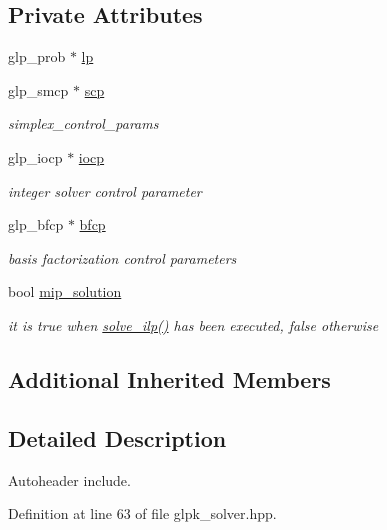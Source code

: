 \subsection*{Private Attributes}
\begin{DoxyCompactItemize}
\item 
glp\+\_\+prob $\ast$ \hyperlink{classglpk__solver_a2e88b7bd295decf6688a99db14cc0190}{lp}
\item 
glp\+\_\+smcp $\ast$ \hyperlink{classglpk__solver_a0466076baa150d2e2debe703ff8e38aa}{scp}
\begin{DoxyCompactList}\small\item\em simplex\+\_\+control\+\_\+params \end{DoxyCompactList}\item 
glp\+\_\+iocp $\ast$ \hyperlink{classglpk__solver_af5bd398e598ed681c555fabb31b5ca67}{iocp}
\begin{DoxyCompactList}\small\item\em integer solver control parameter \end{DoxyCompactList}\item 
glp\+\_\+bfcp $\ast$ \hyperlink{classglpk__solver_ae2ecbdbf0db6bd7ddcf7d7b04444c584}{bfcp}
\begin{DoxyCompactList}\small\item\em basis factorization control parameters \end{DoxyCompactList}\item 
bool \hyperlink{classglpk__solver_a060fdd06a6ecad04ab7dccb654e5fefe}{mip\+\_\+solution}
\begin{DoxyCompactList}\small\item\em it is true when \hyperlink{classglpk__solver_ad27b82487380811e19a1adc2628f8b07}{solve\+\_\+ilp()} has been executed, false otherwise \end{DoxyCompactList}\end{DoxyCompactItemize}
\subsection*{Additional Inherited Members}


\subsection{Detailed Description}
Autoheader include. 

Definition at line 63 of file glpk\+\_\+solver.\+hpp.



